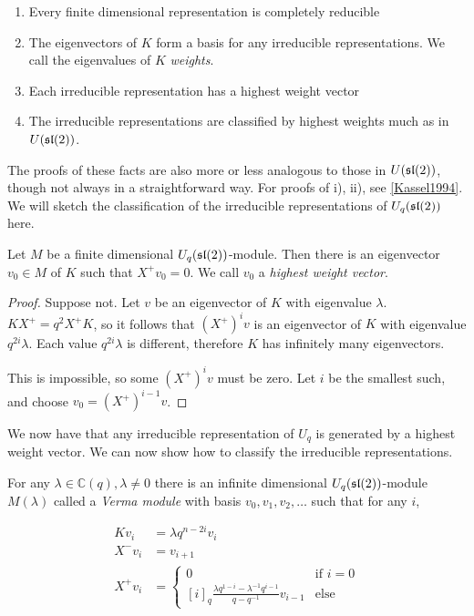 \begin{enumerate}
    \renewcommand{\labelenumi}{\roman{enumi})}
    \item Every finite dimensional representation is completely reducible
    \item The eigenvectors of $K$ form a basis for any irreducible representations. We call the eigenvalues of $K$ \emph{weights}.
    \item Each irreducible representation has a highest weight vector
    \item The irreducible representations are classified by highest weights much as in $U(\mathfrak{sl}(2))$.
\end{enumerate}

The proofs of these facts are also more or less analogous to those in
$U(\mathfrak{sl}(2))$, though not always in a straightforward way. For proofs of i),
ii), see \ref{Kassel1994}. We will sketch the classification of the
irreducible representations of $U_q(\mathfrak{sl}(2))$ here.


\begin{claim}
    Let $M$ be a finite dimensional $U_q(\mathfrak{sl}(2))$-module. Then there is an
    eigenvector $v_0 \in M$ of $K$ such that $ X^+ v_0 = 0$. We call $v_0$ a
    \emph{highest weight vector}.
\end{claim}

\begin{proof}
    Suppose not. Let $v$ be an eigenvector of $K$ with eigenvalue $\lambda$.
    $K X^+ = q^2  X^+ K$, so it follows that $(X^+)^i v$ is an
    eigenvector of $K$ with eigenvalue $q^{2i}\lambda$. Each value
    $q^{2i}\lambda$ is different, therefore $K$ has infinitely many
    eigenvectors. 

    This is impossible, so some $(X^+)^i v$ must be zero. Let $i$ be the
    smallest such, and choose $v_0 = (X^+)^{i-1} v$.
\end{proof}

We now have that any irreducible representation of $U_q$ is generated by a
highest weight vector. We can now show how to classify the irreducible
representations. 

For any $\lambda \in \mathbb{C}(q), \lambda \neq 0$ there is an infinite
dimensional $U_q(\mathfrak{sl}(2))$-module $M(\lambda)$ called a \emph{Verma module}
with basis $v_0, v_1, v_2, \ldots$ such that for any $i$,

\begin{align}
    Kv_i &= \lambda q^{n-2i}v_i \\
    X^-v_i &= v_{i+1} \\
     X^+ v_i &= \begin{cases} 0 & \text{if $i = 0$} \\
                          [i]_q \frac{\lambda q^{1-i} - \lambda^{-1}q^{i-1}}{q - q^{-1}}v_{i-1} & \text{else}
            \end{cases}
\end{align}

